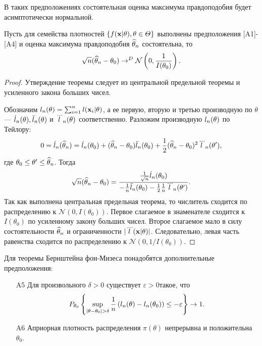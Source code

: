 В таких предположениях состоятельная оценка максимума правдоподобия
будет асимптотически нормальной.

\begin{Theorem}
Пусть для семейства плотностей $\{f(\mathbf{x}|\theta), \theta \in \varTheta\}$ выполнены предположения [A1]-[A4] и оценка максимума правдоподобия $\widehat{\theta}_{n}$ состоятельна, то
\[
\sqrt{n} (\widehat{\theta}_{n} - \theta_0) \rightarrow^D \mathcal{N} \left(0, \frac{1}{I(\theta_0)}\right).
\]
\end{Theorem}

\begin{proof}
Утверждение теоремы следует из центральной предельной теоремы и усиленного закона больших чисел. 

Обозначим $l_n(\theta) = \sum_{i = 1}^{n} l(\mathbf{x}_i | \theta)$,
а ее первую, вторую и третью производную по $\theta$ --- $\dot{l}_n(\theta), \ddot{l}_n(\theta)$ и $\dddot{l}_n(\theta)$ соответственно.
Разложим производную $l_n(\theta)$ по Тейлору:
\[
0 = \dot{l}_{n}(\widehat{\theta}_n) = \dot{l}_{n}(\theta_0) + (\widehat{\theta}_n - \theta_0) \ddot{l}_{n}(\theta_0) + \frac12 (\widehat{\theta}_n - \theta_0)^2 \dddot{l}_{n}(\theta'),
\]
где $\theta_0 \leq \theta' \leq \widehat{\theta}_n$.
Тогда
\[
\sqrt{n} (\widehat{\theta}_n - \theta_0) = \frac{\frac{1}{\sqrt{n}} \dot{l}_{n}(\theta_0)}{-\frac{1}{n} \ddot{l}_{n}(\theta_0) - \frac12 \frac{1}{n} \dddot{l}_{n}(\theta')}. 
\]
Так как выполнена центральная предельная теорема, то числитель сходится по распределению к $\mathcal{N}(0, I(\theta_0))$.
Первое слагаемое в знаменателе сходится к $I(\theta_0)$ по усиленному закону больших чисел.
Второе слагаемое мало в силу состоятельности $\widehat{\theta}_n$ и ограниченности $|\dddot{l}(\mathbf{x} | \theta)|$.
Следовательно, левая часть равенства сходится по распределению к 
$\mathcal{N}(0, 1 / I(\theta_0))$.
\end{proof}

Для теоремы Бернштейна фон-Мизеса понадобятся дополнительные предположения:
\begin{itemize}
	\item[A5] Для произвольного $\delta > 0$ существует $\varepsilon > 0$такое, что
	\[
	P_{\theta_0} \left\{ \sup_{|\theta - \theta_0| > \delta} \frac{1}{n} \left( l_n(\theta) - l_n(\theta_0) \right) \leq -\varepsilon \right\} \rightarrow 1.
	\]
	\item[A6] Априорная плотность распределения $\pi(\theta)$ непрерывна и положительна $\theta_0$.
\end{itemize}

